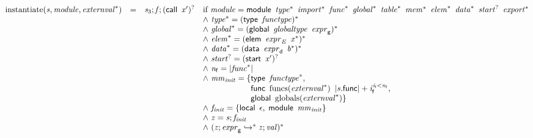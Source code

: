 $$
\begin{array}{@{}lcl@{}l@{}}
{\mathrm{instantiate}}({\mathit{s}}, {\mathit{module}}, {{\mathit{externval}}^\ast}) &=& {\mathit{s}}_{{3}} ; {\mathit{f}} ; {(\mathsf{call}~\,{\mathit{x}'})^?} &\quad
  \mbox{if}~{\mathit{module}} = \mathsf{module}~\,{{\mathit{type}}^\ast}~\,{{\mathit{import}}^\ast}~\,{{\mathit{func}}^\ast}~\,{{\mathit{global}}^\ast}~\,{{\mathit{table}}^\ast}~\,{{\mathit{mem}}^\ast}~\,{{\mathit{elem}}^\ast}~\,{{\mathit{data}}^\ast}~\,{{\mathit{start}}^?}~\,{{\mathit{export}}^\ast} \\
 &&&\quad {\land}~{{\mathit{type}}^\ast} = {(\mathsf{type}~\,{\mathit{functype}})^\ast} \\
 &&&\quad {\land}~{{\mathit{global}}^\ast} = {(\mathsf{global}~\,{\mathit{globaltype}}~\,{\mathit{expr}}_{{\mathsf{g}}})^\ast} \\
 &&&\quad {\land}~{{\mathit{elem}}^\ast} = {(\mathsf{elem}~\,{\mathit{expr}}_{{\mathit{E}}}~\,{{\mathit{x}}^\ast})^\ast} \\
 &&&\quad {\land}~{{\mathit{data}}^\ast} = {(\mathsf{data}~\,{\mathit{expr}}_{{\mathsf{d}}}~\,{{\mathit{b}}^\ast})^\ast} \\
 &&&\quad {\land}~{{\mathit{start}}^?} = {(\mathsf{start}~\,{\mathit{x}'})^?} \\
 &&&\quad {\land}~{\mathit{n}}_{{\mathsf{f}}} = {|{{\mathit{func}}^\ast}|} \\
 &&&\quad {\land}~{\mathit{mm}}_{{\mathit{init}}} = \{ \begin{array}[t]{@{}l@{}}
\mathsf{type}~\,{{\mathit{functype}}^\ast},\; \\
  \mathsf{func}~\,{\mathrm{funcs}}({{\mathit{externval}}^\ast})~\,{{|{\mathit{s}}.\mathsf{func}|} + {\mathit{i}}_{{\mathsf{f}}}^{{\mathit{i}}_{{\mathsf{f}}}<{\mathit{n}}_{{\mathsf{f}}}}},\; \\
  \mathsf{global}~\,{\mathrm{globals}}({{\mathit{externval}}^\ast}) \}\end{array} \\
 &&&\quad {\land}~{\mathit{f}}_{{\mathit{init}}} = \{ \begin{array}[t]{@{}l@{}}
\mathsf{local}~\,\epsilon,\; \mathsf{module}~\,{\mathit{mm}}_{{\mathit{init}}} \}\end{array} \\
 &&&\quad {\land}~{\mathit{z}} = {\mathit{s}} ; {\mathit{f}}_{{\mathit{init}}} \\
 &&&\quad {\land}~({\mathit{z}} ; {\mathit{expr}}_{{\mathsf{g}}} \hookrightarrow^\ast {\mathit{z}} ; {\mathit{val}})^\ast \\

\end{array}$$
